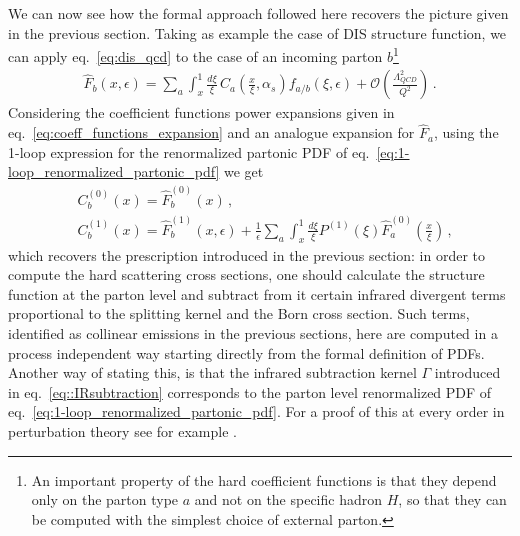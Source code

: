 %
We can now see how the formal approach followed here recovers the picture given in the previous section.
Taking as example the case of DIS structure function, we can apply eq.~\eqref{eq:dis_qcd} to the case of an 
incoming parton $b$\footnote{An important property of the hard coefficient functions is that they 
depend only on the parton type $a$ and not on the specific hadron $H$, 
so that they can be computed with the simplest choice of external parton.}
\begin{align}
    \label{eq:partonic_structure_function}
    \hat{F}_{b}\left(x,\epsilon\right) = 
    \sum_a \int_x^1\frac{d\xi}{\xi}\,C_a\left(\frac{x}{\xi}, \alpha_s\right)f_{a/b}\left(\xi,\epsilon\right)
    +\mathcal{O}\left(\frac{\Lambda_{QCD}^2}{Q^2}\right)\,.
\end{align}
Considering the coefficient functions power expansions given in eq.~\eqref{eq:coeff_functions_expansion}
and an analogue expansion for $\hat{F}_{a}$, using the 1-loop expression for the
renormalized partonic PDF of eq.~\eqref{eq:1-loop_renormalized_partonic_pdf} we get
\begin{align}
    \label{eq:IR_subtraction_from_formal_definition}
    &C^{(0)}_b\left(x\right) = \hat{F}_b^{(0)}\left(x\right)\,,\\
    &C^{(1)}_b\left(x\right) = \hat{F}_b^{(1)}\left(x,\epsilon\right) + \frac{1}{\epsilon}\sum_a\int_x^1 \frac{d\xi}{\xi}P^{(1)}\left(\xi\right)
    \hat{F}_a^{(0)}\left(\frac{x}{\xi}\right)\,,
\end{align}
which recovers the prescription introduced in the previous section: in order to compute
the hard scattering cross sections, one should calculate the structure function at the parton level and subtract
from it certain infrared divergent terms proportional to the splitting kernel and the Born cross section.
Such terms, identified as collinear emissions in the previous sections, here are computed in a process independent
way starting directly from the formal definition of PDFs.
Another way of stating this, is that the infrared subtraction kernel $\Gamma$ introduced in eq.~\eqref{eq::IRsubtraction}
corresponds to the parton level renormalized PDF of eq.~\eqref{eq:1-loop_renormalized_partonic_pdf}. For a proof
of this at every order in perturbation theory see for example \cite{Collins:1980ui}.


